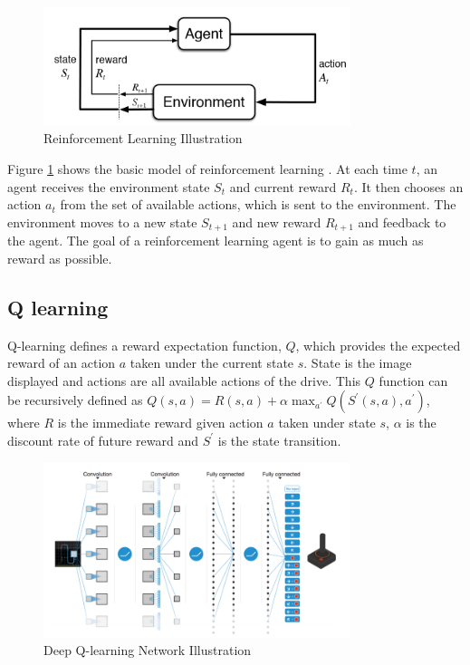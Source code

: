 \documentclass[a4paper]{article}
\begin{document}
\begin{figure}
    \centering
    \includegraphics[width=0.8\textwidth]{./figures/rl.png}
    \caption{ Reinforcement Learning Illustration \cite{rlIntroduction}}
    \label{fig:RL}
\end{figure}



Figure \ref{fig:RL} shows the basic model of reinforcement learning \cite{rlIntroduction}. At
each time $t$, an agent receives the environment state $S_t$ and current reward $R_t$. It then
chooses an action $a_t$ from the set of available actions, which is sent to the environment. The
environment moves to a new state $S_{t+1}$ and new reward $R_{t+1}$ and feedback to the agent.
The goal of a reinforcement learning agent is to gain as much as reward as possible.

\subsection{Q learning}
Q-learning defines a reward
expectation function, $Q$, which provides the expected reward of an action $a$ taken under the
current state $s$. State is the image displayed and actions are all available actions of the
drive. This $Q$ function can be recursively defined as $Q(s,a) = R(s,a) + \alpha \max_{a^{'}}
Q(S^{'}(s,a),a^{'})$, where $R$ is the immediate reward given action $a$ taken under state $s$,
$\alpha$ is the discount rate of future reward and $S^{'}$ is the state transition.

\begin{figure}
	\centering
	\includegraphics[width=0.8\textwidth]{./figures/deepq.png}
    \caption{ Deep Q-learning Network Illustration \cite{dqn}}
	\label{fig:deepq}
\end{figure}
\end{document}

